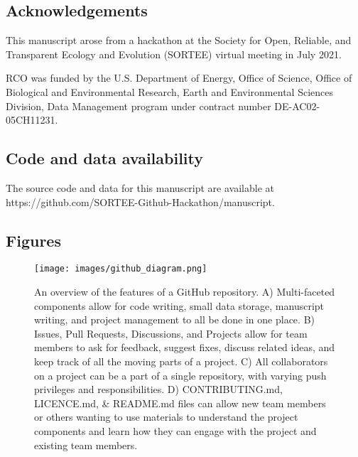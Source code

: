 \hypertarget{acknowledgements}{%
\subsection{Acknowledgements}\label{acknowledgements}}

This manuscript arose from a hackathon at the Society for Open, Reliable, and Transparent Ecology and Evolution (SORTEE) virtual meeting in July 2021.

RCO was funded by the U.S. Department of Energy, Office of Science, Office of Biological and Environmental Research, Earth and Environmental Sciences Division, Data Management program under contract number DE-AC02-05CH11231.

\hypertarget{code-and-data-availability}{%
\subsection{Code and data availability}\label{code-and-data-availability}}

The source code and data for this manuscript are available at https://github.com/SORTEE-Github-Hackathon/manuscript.

\hypertarget{figures}{%
\subsection{Figures}\label{figures}}

\begin{figure}
\hypertarget{fig:github-diagram}{%
\centering
\texttt{[image: images/github\_diagram.png]}
\caption{An overview of the features of a GitHub repository. A) Multi-faceted components allow for code writing, small data storage, manuscript writing, and project management to all be done in one place. B) Issues, Pull Requests, Discussions, and Projects allow for team members to ask for feedback, suggest fixes, discuss related ideas, and keep track of all the moving parts of a project. C) All collaborators on a project can be a part of a single repository, with varying push privileges and responsibilities. D) CONTRIBUTING.md, LICENCE.md, \& README.md files can allow new team members or others wanting to use materials to understand the project components and learn how they can engage with the project and existing team members.}\label{fig:github-diagram}
}
\end{figure}

